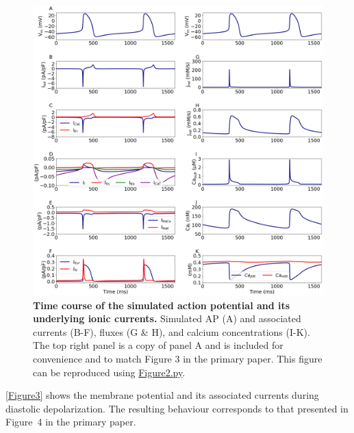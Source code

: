 \documentclass[fleqn,10pt]{physiome}
\begin{document}
\begin{figure}[htb]
\centering
\includegraphics[width=1\linewidth]{Figure2}
\caption{\textbf{Time course of the simulated action potential and its underlying ionic currents.}\newline
Simulated AP (A) and associated currents (B-F), fluxes (G \& H), and calcium concentrations (I-K). The top right panel is a copy of panel A and is included for convenience and to match Figure 3 in the primary paper. This figure can be reproduced using \href{https://models.physiomeproject.org/workspace/648/rawfile/6784d6c3256c832dc98b2db42c85747ae2596518/Figure2.py}{Figure2.py}.}
\label{Figure2}
\end{figure}

\autoref{Figure3} shows the membrane potential and its associated currents during diastolic depolarization. The resulting behaviour corresponds to that presented in Figure~4 in the primary paper.
\end{document}
